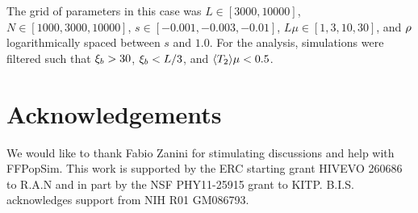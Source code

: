 The grid of parameters in this case was $L\in [3000, 10000]$, $N\in
[1000,3000, 10000]$, $s \in [-0.001, -0.003, -0.01]$, $L\mu \in [1,3,
10, 30]$, and $\rho$ logarithmically spaced between $s$ and $1.0$. 
For the analysis, simulations were filtered such that ${\xi_b}>30$, 
${\xi_b}<L/3$, and $\langle T_2\rangle \mu <0.5$.


\section{Acknowledgements}
We would like to thank Fabio Zanini for stimulating discussions and help
with FFPopSim. This work is supported by the ERC starting grant HIVEVO
260686 to R.A.N and in part by the NSF PHY11-25915 grant to
KITP. B.I.S. acknowledges support from NIH R01 GM086793.

%

%


